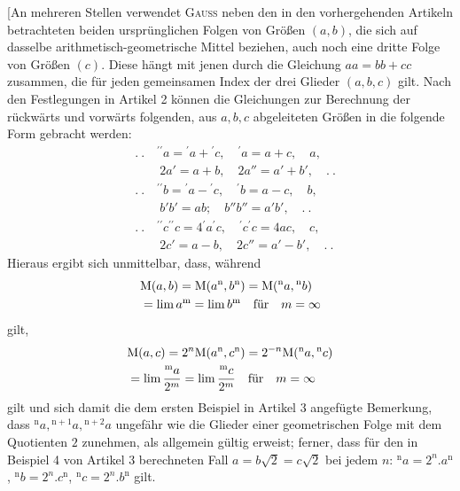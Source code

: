 [An mehreren Stellen verwendet \textsc{Gauss} neben den in den vorhergehenden Artikeln betrachteten beiden ursprünglichen Folgen von Größen $(a,b)$, die sich auf dasselbe arithmetisch-geometrische Mittel beziehen, auch noch eine dritte Folge von Größen $(c)$. Diese hängt mit jenen durch die Gleichung $aa=bb+cc$ zusammen, die für jeden gemeinsamen Index der drei Glieder $(a,b,c)$ gilt. Nach den Festlegungen in Artikel 2 können die Gleichungen zur Berechnung der rückwärts und vorwärts folgenden, aus $a,b,c$ abgeleiteten Größen in die folgende Form gebracht werden:
\[
\begin{aligned}&.\ .\quad{}^{\prime\prime}a={}^\prime a+{}^\prime c,\quad{}^\prime a=a+c,\quad a,\\&\qquad2a'=a+b,\quad2a''=a'+b',\quad.\ .\\[9pt]&.\ .\quad{}^{\prime\prime}b={}^\prime a-{}^\prime c,\quad{}^\prime b=a-c,\quad b,\\&\qquad b'b'=ab; \quad b''b''=a'b',\quad.\ .\\[9pt]&.\ .\quad{}^{\prime\prime}c{}^{\prime\prime}c=4{}^\prime a{}^\prime c,\quad{}^\prime c{}^\prime c=4ac,\quad c,\\&\qquad2c'=a-b,\quad2c''=a'-b',\quad.\ .\end{aligned}
\]
Hieraus ergibt sich unmittelbar, dass, während
\[
\begin{aligned}&\mathrm{M}(a,b)=\mathrm{M}(a^{\mathrm{n}},b^{\mathrm{n}})=\mathrm{M}({}^{\mathrm{n}}a,{}^{\mathrm{n}}b)\\&=\lim a^{\mathrm{m}}=\lim b^{\mathrm{m}}\quad\hbox{für}\quad m=\infty\end{aligned}
\]
gilt,
\[
\begin{aligned}&\mathrm{M}(a,c)=2^n\mathrm{M}(a^{\mathrm{n}},c^{\mathrm{n}})=2^{-n}\mathrm{M}({}^{\mathrm{n}}a,{}^{\mathrm{n}}c)\\&=\lim\frac{{}^{\mathrm{m}}a}{2^m}=\lim\frac{{}^{\mathrm{m}}c}{2^m}\quad\hbox{für}\quad m=\infty\end{aligned}
\]
gilt und sich damit die dem ersten Beispiel in Artikel 3 angefügte Bemerkung, dass ${}^{\mathrm{n}}a,{}^{\mathrm{n}+1}a,{}^{\mathrm{n}+2}a$ ungefähr wie die Glieder einer geometrischen Folge mit dem Quotienten $2$ zunehmen, als allgemein gültig erweist; ferner, dass für den in Beispiel 4 von Artikel 3 berechneten Fall $a=b\surd2=c\surd2$ bei jedem $n$: ${}^{\mathrm{n}}a=2^n.a^{\mathrm{n}}$, ${}^{\mathrm{n}}b=2^n.c^{\mathrm{n}}$, ${}^{\mathrm{n}}c=2^n.b^{\mathrm{n}}$ gilt.

